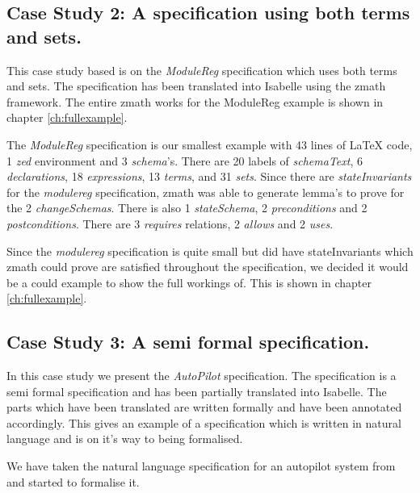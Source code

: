 \subsection{Case Study 2: A specification using both terms and sets.}

This case study based is on the \emph{ModuleReg} specification which uses both
terms and sets. The specification has been translated into Isabelle using the
\gls{zmath} framework. The entire \gls{zmath} works for the ModuleReg example is
shown in chapter \ref{ch:fullexample}.

The \emph{ModuleReg} specification is our smallest example with 43 lines of
\LaTeX{} code, 1 \emph{zed} environment and 3 \emph{schema}'s. There are 20
labels of \emph{schemaText}, 6 \emph{declarations}, 18 \emph{expressions}, 13
\emph{terms}, and 31 \emph{sets}. Since there are \emph{stateInvariants} for the
\emph{modulereg} specification, \gls{zmath} was able to generate lemma's to
prove for the 2 \emph{changeSchemas}. There is also 1 \emph{stateSchema}, 2
\emph{preconditions} and 2 \emph{postconditions}. There are 3 \emph{requires}
relations, 2 \emph{allows} and 2 \emph{uses}.

Since the \emph{modulereg} specification is quite small but did have
stateInvariants which \gls{zmath} could prove are satisfied throughout the
specification, we decided it would be a could example to show the full workings
of. This is shown in chapter \ref{ch:fullexample}.



\subsection{Case Study 3: A semi formal specification.}

In this case study we present the \emph{AutoPilot} specification. The
specification is a semi formal specification and has been partially translated
into Isabelle. The parts which have been translated are written formally and
have been annotated accordingly. This gives an example of a specification which
is written in natural language and is on it's way to being formalised.

We have taken the natural language specification for an autopilot system from
\cite{Butler96} and started to formalise it.

